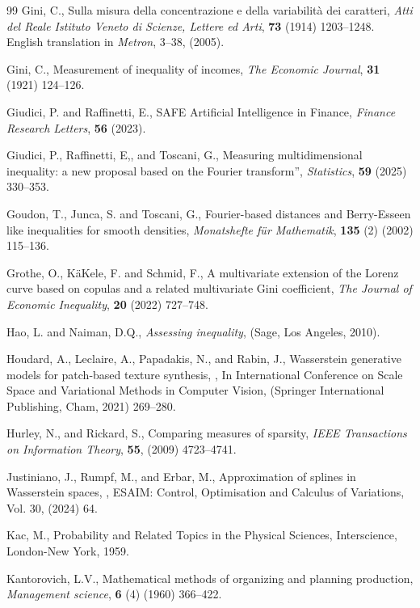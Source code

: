 \documentclass{article}
\begin{document}
\begin{thebibliography}{99}
Gini, C.,  Sulla misura della concentrazione e della variabilit\`a dei caratteri, \textit{Atti del Reale Istituto Veneto di Scienze, Lettere ed Arti}, \textbf{73}  (1914) 1203--1248. English translation in \textit{Metron}, 3--38, (2005).

Gini, C.,  Measurement of inequality of incomes, \textit{The Economic Journal}, \textbf{31}  (1921) 124--126.


Giudici, P. and Raffinetti, E., SAFE Artificial Intelligence in Finance, \textit{Finance Research Letters}, \textbf{56}  (2023).


Giudici, P., Raffinetti, E,, and Toscani, G.,
  {Measuring multidimensional inequality: a new proposal based on the {F}ourier transform}'',
 \textit{Statistics}, \textbf{59} (2025) 330--353.
 
 Goudon, T.,  Junca, S. and Toscani, G., Fourier-based distances and Berry-Esseen like inequalities for smooth densities, \emph{Monatshefte f\"ur Mathematik}, \textbf{135} (2)  (2002) 115--136.
 
Grothe, O., K{\"a}Kele, F. and Schmid, F.,  A multivariate extension of the Lorenz curve based on copulas and a related multivariate Gini coefficient, \textit{The Journal of Economic Inequality}, \textbf{20} (2022) 727--748.

Hao, L. and Naiman, D.Q., \textit{Assessing inequality}, (Sage, Los Angeles, 2010).

Houdard, A., Leclaire, A., Papadakis, N., and Rabin, J., Wasserstein generative models for patch-based texture synthesis,  , In International Conference on Scale Space and Variational Methods in Computer Vision, (Springer International Publishing, Cham, 2021) 269--280.


Hurley, N., and Rickard, S., Comparing measures of sparsity, \textit{IEEE Transactions on Information Theory}, \textbf{55},  (2009) 4723--4741. 

Justiniano, J., Rumpf, M., and Erbar, M., Approximation of splines in Wasserstein spaces,  , ESAIM: Control, Optimisation and Calculus of Variations, Vol. 30, (2024) 64.

Kac, M., Probability and Related Topics in the Physical Sciences, Interscience, London-New York, 1959. 

Kantorovich, L.V., 
Mathematical methods of organizing and planning production, 
 \textit{Management science}, \textbf{6} (4)  (1960)
  366--422.


\end{thebibliography}
\end{document}
